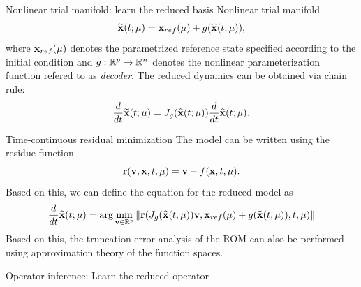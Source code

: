 \documentclass{beamer}
\begin{document}
\begin{frame}{Nonlinear trial manifold: learn the reduced basis}
	Nonlinear trial manifold\footnotemark
	\begin{equation}
		\widetilde {\mathbf{x}}(t;\mu)= \mathbf{x}_{ref}(\mu) + g(\widehat {\mathbf{x}}(t;\mu)),
	\end{equation}
	where $\mathbf{x}_{ref}(\mu)$ denotes the parametrized reference state specified according to the initial condition and $g:\mathbb{R}^p \rightarrow \mathbb{R}^n$
	denotes the nonlinear parameterization function refered to as \textit{decoder}.	The reduced dynamics can be obtained via chain rule:
	\begin{equation}
		\frac{d}{dt}\widetilde {\mathbf{x}}(t;\mu) = J_g(\widehat {\mathbf{x}}(t;\mu))\frac{d}{dt}\widehat {\mathbf{x}}(t;\mu).
	\end{equation}
\end{frame}

\begin{frame}{Time-continuous residual minimization}
	The model can be written using the residue function
	\begin{equation}
		\mathbf{r}(\mathbf{v}, \mathbf{x}, t, \mu) =  \mathbf{v} - f(\mathbf{x}, t, \mu).
	\end{equation}
	Based on this, we can define the equation for the reduced model as 
	\begin{equation}
		\frac{d}{dt}\widehat {\mathbf{x}}(t;\mu) = \arg\min_{\mathbf{v}\in\mathbb{R}^p}\left\| \mathbf{r}(J_g(\widehat {\mathbf{x}}(t;\mu))\mathbf{v}, \mathbf{x}_{ref}(\mu) + g(\widehat {\mathbf{x}}(t;\mu)), t, \mu) \right\|
	\end{equation}
	Based on this, the truncation error analysis of the ROM can also be performed using approximation theory of the function spaces.
\end{frame}

\begin{frame}{Operator inference: Learn the reduced operator}
	
\end{frame}
\end{document}
